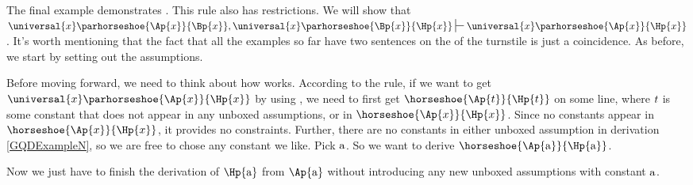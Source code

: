 The final example demonstrates . 
This rule also has restrictions. 
We will show that $\universal{\variable{x}}\parhorseshoe{\Ap{\variable{x}}}{\Bp{\variable{x}}},\universal{\variable{x}}\parhorseshoe{\Bp{\variable{x}}}{\Hp{\variable{x}}}\sststile{}{}\universal{\variable{x}}\parhorseshoe{\Ap{\variable{x}}}{\Hp{\variable{x}}}$.
It's worth mentioning that the fact that all the examples so far have two sentences on the  of the turnstile is just a coincidence.
As before, we start by setting out the assumptions.
\begin{gproof}[\label{GQDExampleN}]
\end{gproof}
Before moving forward, we need to think about how  works. 
According to the rule, if we want to get $\universal{\variable{x}}\parhorseshoe{\Ap{\variable{x}}}{\Hp{\variable{x}}}$ by using , we need to first get $\horseshoe{\Ap{\variable{t}}}{\Hp{\variable{t}}}$ on some line, where $t$ is some constant that does not appear in any unboxed assumptions, or in $\horseshoe{\Ap{\variable{x}}}{\Hp{\variable{x}}}$.
Since no constants appear in $\horseshoe{\Ap{\variable{x}}}{\Hp{\variable{x}}}$, it provides no constraints. 
Further, there are no constants in either unboxed assumption in derivation \ref{GQDExampleN}, so we are free to chose any constant we like. 
Pick $\mathrm{a}$. 
So we want to derive $\horseshoe{\Ap{\constant{a}}}{\Hp{\constant{a}}}$.
\begin{gproof}[\label{GQDExampleO}]
\end{gproof}
Now we just have to finish the derivation of $\Hp{\constant{a}}$ from $\Ap{\constant{a}}$ without introducing any new unboxed assumptions with constant $\mathrm{a}$. 
